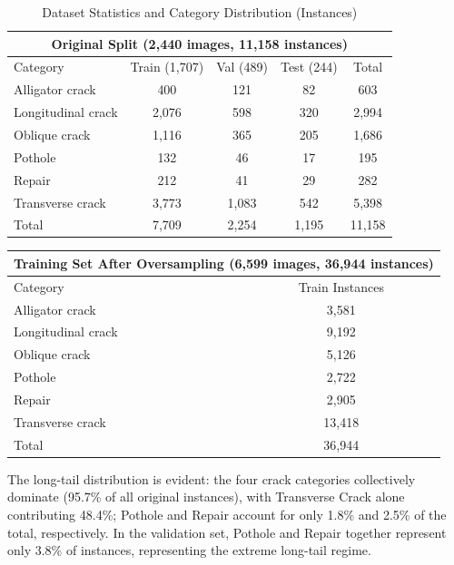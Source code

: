 \documentclass{ieeeaccess}
\begin{document}
\begin{table}[!t]
\caption{Dataset Statistics and Category Distribution (Instances)}
\label{tab:dataset}
\centering
\setlength{\tabcolsep}{4.2pt}
\begin{tabular}{lcccc}
\toprule
\multicolumn{5}{c}{Original Split (2,440 images, 11,158 instances)} \\
\midrule
Category & Train (1,707) & Val (489) & Test (244) & Total \\
\midrule
Alligator crack    & 400  & 121 & 82  & 603  \\
Longitudinal crack & 2,076 & 598 & 320 & 2,994 \\
Oblique crack      & 1,116 & 365 & 205 & 1,686 \\
Pothole            & 132  & 46  & 17  & 195  \\
Repair             & 212  & 41  & 29  & 282  \\
Transverse crack   & 3,773 & 1,083 & 542 & 5,398 \\
\midrule
Total              & 7,709 & 2,254 & 1,195 & 11,158 \\
\bottomrule
\end{tabular}
\end{table}

\begin{table}[!t]
\centering
\setlength{\tabcolsep}{5.5pt}
\begin{tabular}{lc}
\toprule
\multicolumn{2}{c}{Training Set After Oversampling (6,599 images, 36,944 instances)} \\
\midrule
Category & Train Instances \\
\midrule
Alligator crack    & 3,581 \\
Longitudinal crack & 9,192 \\
Oblique crack      & 5,126 \\
Pothole            & 2,722 \\
Repair             & 2,905 \\
Transverse crack   & 13,418 \\
\midrule
Total              & 36,944 \\
\bottomrule
\end{tabular}
\end{table}

The long-tail distribution is evident: the four crack categories collectively dominate (95.7\% of all original instances), with Transverse Crack alone contributing 48.4\%; Pothole and Repair account for only 1.8\% and 2.5\% of the total, respectively. In the validation set, Pothole and Repair together represent only 3.8\% of instances, representing the extreme long-tail regime.
\end{document}
